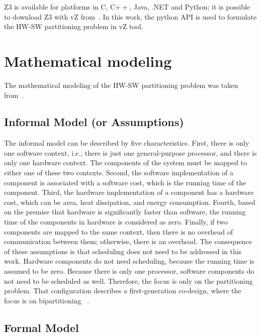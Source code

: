 Z3 is available for platforms in C, C$++$, Java, .NET and Python; it is possible to download Z3 with vZ from~\cite{Z3API}. In this work, the python API is used to formulate the HW-SW partitioning problem in vZ tool. 

\section{Mathematical modeling}
\label{Mathematical-modeling}

The mathematical modeling of the HW-SW partitioning problem was taken from~\cite{Arato2003,Mann2007}.

\subsection{Informal Model (or Assumptions)}
\label{Informal-Model-or-Assumptions}

The informal model can be described by five characteristics. First, there is only one software context, i.e., there is just one general-purpose processor, and there is only one hardware context. The components of the system must be mapped to either one of these two contexts. Second, the software implementation of a component is associated with a software cost, which is the running time of the component. Third, the hardware implementation of a component has a hardware cost, which can be area, heat dissipation, and energy consumption. Fourth, based on the premise that hardware is significantly faster than software, the running time of the components in hardware is considered as zero. Finally, if two components are mapped to the same context, then there is no overhead of communication between them; otherwise, there is an overhead. The consequence of these assumptions is that scheduling does not need to be addressed in this work. Hardware components do not need scheduling, because the running time is assumed to be zero. Because there is only one processor, software components do not need to be scheduled as well. Therefore, the focus is only on the partitioning problem. That configuration describes a first-generation co-design, where the focus is on bipartitioning ~\cite{Teich2012}.

\subsection{Formal Model}
\label{Formal-Model}

